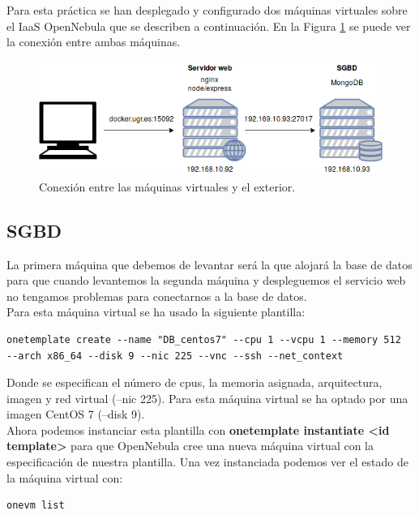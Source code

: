Para esta práctica se han desplegado y configurado dos máquinas virtuales sobre el IaaS OpenNebula que se describen a continuación. En la Figura \ref{fig:ccsa} se puede ver la conexión entre ambas máquinas.

\begin{figure}[h!]
	\centering
	\includegraphics[width=13cm]{./images/ccsa}
	\caption{Conexión entre las máquinas virtuales y el exterior.} 
	\label{fig:ccsa}
\end{figure}


\subsection{SGBD}

La primera máquina que debemos de levantar será la que alojará la base de datos para que cuando levantemos la segunda máquina y despleguemos el servicio web no tengamos problemas para conectarnos a la base de datos. \\

Para esta máquina virtual se ha usado la siguiente plantilla: \\

\begin{lstlisting}
onetemplate create --name "DB_centos7" --cpu 1 --vcpu 1 --memory 512 
--arch x86_64 --disk 9 --nic 225 --vnc --ssh --net_context
\end{lstlisting}

Donde se especifican el número de cpus, la memoria asignada, arquitectura, imagen y red virtual (--nic 225). Para esta máquina virtual se ha optado por una imagen CentOS 7 (--disk 9). \\

Ahora podemos instanciar esta plantilla con \textbf{onetemplate instantiate <id template>} para que OpenNebula cree una nueva máquina virtual con la especificación de nuestra plantilla. Una vez instanciada podemos ver el estado de la máquina virtual con: \\

\begin{lstlisting}
onevm list
\end{lstlisting}

